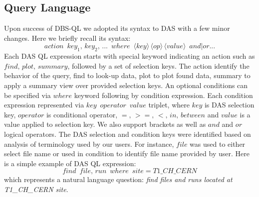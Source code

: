 \documentclass[a4paper]{jpconf}
\begin{document}
\subsection{Query Language\label{DAS-QL}}
Upon success of DBS-QL \cite{DBS-QL} we adopted its syntax to DAS with a few minor
changes. Here we briefly recall its syntax:
\begin{equation}
action\,\,\,
key_1,\, key_2,\, ...\,\,\, where\,\,\,
\langle key\rangle\, 
\langle op\rangle\, 
\langle value\rangle \,\,\, and|or ...
\label{QL_syntax}
\end{equation}
Each DAS QL expression starts with special keyword indicating an action such as 
$find,\, plot,\, summary$, followed by a set of selection keys. The action identify
the behavior of the query, find to look-up data, plot to plot found data, summary to
apply a summary view over provided selection keys. An optional conditions can be 
specified via $where$ keyword following by condition expression.
Each condition expression represented via $key\,\,\, operator\,\,\, value$ triplet, where
$key$ is DAS selection key, $operator$ is conditional operator, 
$=,\, >=,\, <,\, in,\, between$ and $value$ is a value applied to selection key.
We also support brackets as well as $and$ and $or$ logical operators.
The DAS selection and condition keys were identified based on analysis 
of terminology used by our users. For instance, $file$ was used to either
select file name or used in condition to identify file name provided by user.
Here is a simple example of DAS QL expression:
$$
find\,\,\, file,\, run\,\,\, where\,\,\, site=T1\_CH\_CERN
$$
which represents a natural language question: 
{\it find files and runs located at T1\_CH\_CERN site}.
\end{document}
